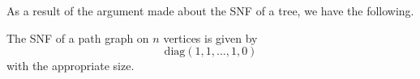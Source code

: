 As a result of the argument made about the SNF of a tree, we have the following.

\begin{theorem}
    The SNF of a path graph on $n$ vertices is given by $$\text{diag}(1,1,...,1,0)$$ with the appropriate size.
\end{theorem}